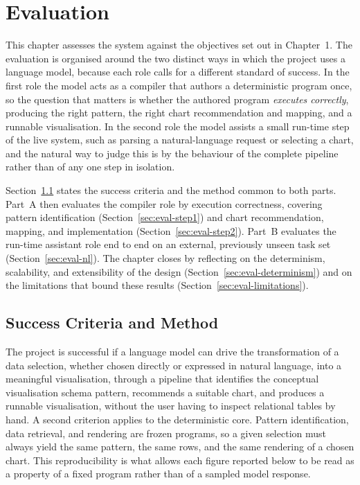 

\chapter{Evaluation}
\label{ch:evaluation}

This chapter assesses the system against the objectives set out in Chapter~1. The evaluation is organised around the two distinct ways in which the project uses a language model, because each role calls for a different standard of success. In the first role the model acts as a compiler that authors a deterministic program once, so the question that matters is whether the authored program \emph{executes correctly}, producing the right pattern, the right chart recommendation and mapping, and a runnable visualisation. In the second role the model assists a small run-time step of the live system, such as parsing a natural-language request or selecting a chart, and the natural way to judge this is by the behaviour of the complete pipeline rather than of any one step in isolation.

Section~\ref{sec:eval-setup} states the success criteria and the method common to both parts. Part~A then evaluates the compiler role by execution correctness, covering pattern identification (Section~\ref{sec:eval-step1}) and chart recommendation, mapping, and implementation (Section~\ref{sec:eval-step2}). Part~B evaluates the run-time assistant role end to end on an external, previously unseen task set (Section~\ref{sec:eval-nl}). The chapter closes by reflecting on the determinism, scalability, and extensibility of the design (Section~\ref{sec:eval-determinism}) and on the limitations that bound these results (Section~\ref{sec:eval-limitations}).

\section{Success Criteria and Method}
\label{sec:eval-setup}

The project is successful if a language model can drive the transformation of a data selection, whether chosen directly or expressed in natural language, into a meaningful visualisation, through a pipeline that identifies the conceptual visualisation schema pattern, recommends a suitable chart, and produces a runnable visualisation, without the user having to inspect relational tables by hand. A second criterion applies to the deterministic core. Pattern identification, data retrieval, and rendering are frozen programs, so a given selection must always yield the same pattern, the same rows, and the same rendering of a chosen chart. This reproducibility is what allows each figure reported below to be read as a property of a fixed program rather than of a sampled model response.

